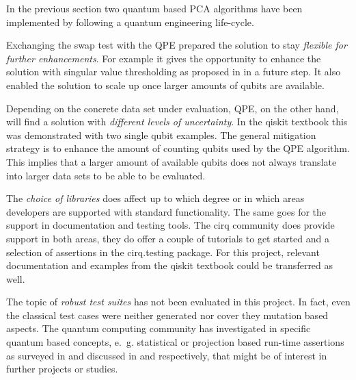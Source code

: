 \noindent
In the previous section two quantum based PCA algorithms have been implemented by following a quantum engineering life-cycle.

Exchanging the swap test with the QPE prepared the solution to stay \emph{flexible for further enhancements}. For example it gives the opportunity to enhance the solution with singular value thresholding as proposed in \cite{He_2021} in a future step. It also enabled the solution to scale up once larger amounts of qubits are available.

Depending on the concrete data set under evaluation, QPE, on the other hand, will find a solution with \emph{different levels of uncertainty}. In the qiskit textbook \cite{Qtb_Qpe} this was demonstrated with two single qubit examples. The general mitigation strategy is to enhance the amount of counting qubits used by the QPE algorithm. This implies that a larger amount of available qubits does not always translate into larger data sets to be able to be evaluated.

The \emph{choice of libraries} does affect up to which degree or in which areas developers are supported with standard functionality. The same goes for the support in documentation and testing tools. The cirq community does provide support in both areas, they do offer a couple of tutorials to get started and a selection of assertions in the cirq.testing package. For this project, relevant documentation and examples from the qiskit textbook could be transferred as well.

The topic of \emph{robust test suites} has not been evaluated in this project. In fact, even the classical test cases were neither generated nor cover they mutation based aspects. The quantum computing community has investigated in specific quantum based concepts, e.~g. statistical or projection based run-time assertions as surveyed in \cite[pp. 12-13]{Zhao_2020} and discussed in \cite{Huang_2019} and \cite{Li_2019} respectively, that might be of interest in further projects or studies.

